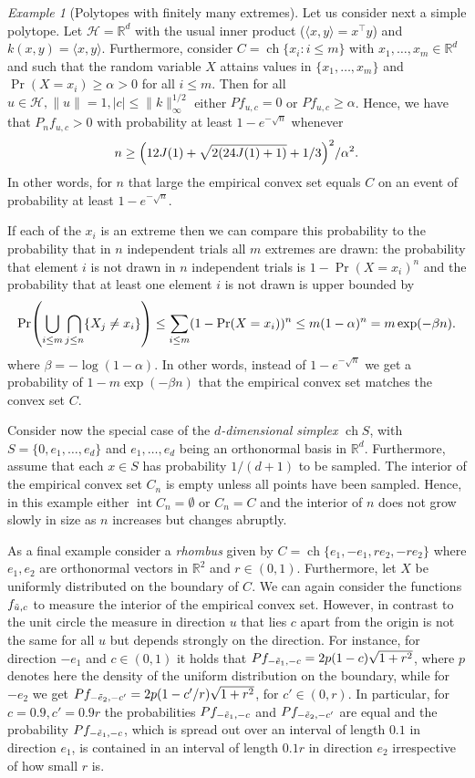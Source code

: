 \documentclass[AHL,Unicode,longabstracts,published]{cedram}
\theoremstyle{remark}
\newtheorem{examl}{Example}
\DeclareMathOperator{\ch}{ch}
\DeclareMathOperator{\intr}{int}
\newcommand{\R}{\mathbb{R}}
\newcommand{\cH}{\mathcal{H}}
\let\oldtilde\tilde
\renewcommand*{\tilde}[1]{\mathchoice{\widetilde{#1}}{\widetilde{#1}}{\oldtilde{#1}}{\oldtilde{#1}}}
\let\originalleft\left
\let\originalright\right
\renewcommand{\left}{\mathopen{}\mathclose\bgroup\originalleft}
\renewcommand{\right}{\aftergroup\egroup\originalright}
\begin{document}
\begin{examl}[{Polytopes with finitely many extremes}]
Let us consider next a simple polytope. Let $\cH = \R^d$ with the usual inner product ($\langle x,y \rangle = x^\top y$) and $k(x,y) = \langle x,y \rangle$. Furthermore, consider $C = \ch\{x_i : i \leq m \} $ with $x_1,\dots, x_m \in \R^d$ and such that the random variable $X$ attains values in $\{x_1, \dots, x_m\}$ and $\Pr(X = x_i) \geq \alpha > 0$ for all $i\leq m$. Then for all $u\in \cH, \|u\| =1, |c| \leq \|k\|_\infty^{1/2}$ either $P f_{u,c} =0$ or $P f_{u,c}
\geq \alpha$. Hence, we have that $P_n f_{u,c} > 0$ with probability at least $1-e^{-\sqrt{n}}$ whenever
\[
n \geq \left(12 J(1) + \sqrt{2(24 J(1) + 1)} +1/3\right)^2/\alpha^2.
\]
In other words, for $n$ that large the empirical convex set equals $C$ on an event of probability at least $1-e^{-\sqrt{n}}$.

If each of the $x_i$ is an extreme then we can compare this probability to the probability that in $n$ independent trials all $m$ extremes are drawn: the probability that element $i$ is not drawn in $n$ independent trials is $1-\Pr(X=x_i)^n$ and the probability that at least one element $i$ is not drawn is upper bounded by
\[
\Pr\left(\bigcup_{i \leq m} \bigcap_{j\leq n} \{X_j \not = x_i\}\right) \leq \sum_{i \leq m} (1-\Pr(X=x_i))^n \leq m (1-\alpha)^n = m \exp(- \beta n).
\]
where $\beta = -\log(1-\alpha)$. In other words, instead of $1-e^{-\sqrt{n}}$ we get a probability of $1-m \exp(-\beta n)$ that the empirical convex set matches the convex set $C$.

Consider now the special case of the \emph{$d$-dimensional simplex} $\ch S$, with $S = \{0,e_1,\dots,e_d\}$ and $e_1,\dots, e_d$ being an orthonormal basis in $\R^d$. Furthermore, assume that each $x \in S$ has probability $1/(d +1)$ to be sampled. The interior of the empirical convex set $C_n$ is empty unless all points have been sampled. Hence, in this example either $\intr C_n = \emptyset$ or $C_n = C$ and the interior of $n$ does not grow slowly in size as $n$ increases but changes abruptly.

As a final example consider a \emph{rhombus} given by $C = \ch \{e_1,-e_1, r e_2, -r e_2\}$ where $e_1,e_2$ are orthonormal vectors in $\R^2$ and $r \in (0,1)$. Furthermore, let $X$ be uniformly distributed on the boundary of $C$. We can again consider the functions $f_{\tilde u,c}$ to measure the interior of the empirical convex set. However, in contrast to the unit circle the measure in direction $u$ that lies $c$ apart from the origin is not the same for all $u$ but depends strongly on the direction. For instance, for direction $ -e_1$ and $c \in (0,1)$ it holds that $P f_{-\tilde{e}_1,-c} = 2 p (1-c)\sqrt{1+r^2}$, where $p$ denotes here the density of the uniform distribution on the boundary, while for $-e_2$ we get $Pf_{-\tilde{e}_2,-c'} = 2p(1-c'/r) \sqrt{1+r^2}$, for $c' \in (0,r)$. In particular, for $c = 0.9, c'=0.9 r$ the probabilities $P f_{-\tilde{e}_1,-c}$ and $Pf_{-\tilde{e}_2,-c'}$ are equal and the probability $P f_{-\tilde{e}_1,-c}$, which is spread out over an interval of length $0.1$ in direction $e_1$, is contained in an interval of length $0.1 r$ in direction $e_2$ irrespective of how small $r$ is.


\end{examl}
\end{document}
